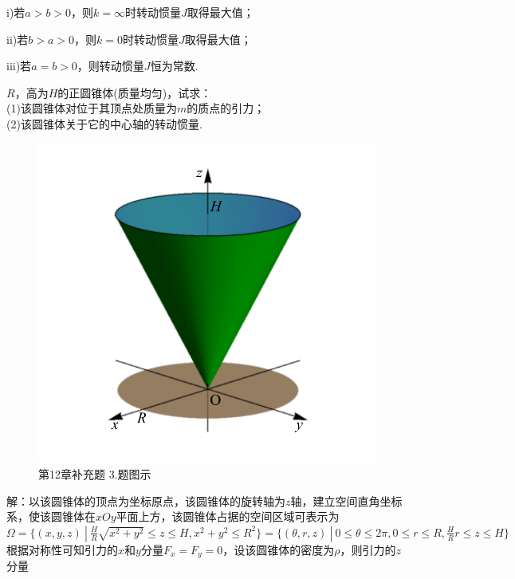 \documentclass[12pt,UTF8]{ctexart}
\newcommand\Set[2]{\{#1\ |\ #2 \}}
\begin{document}
\begin{enumerate}
i)若$a>b>0$，则$k=\infty$时转动惯量$J$取得最大值；

ii)若$b>a>0$，则$k=0$时转动惯量$J$取得最大值；

iii)若$a=b>0$，则转动惯量$J$恒为常数.

$R$，高为$H$的正圆锥体(质量均匀)，试求：\\
(1)该圆锥体对位于其顶点处质量为$m$的质点的引力；\\
(2)该圆锥体关于它的中心轴的转动惯量.

\begin{figure}[H]
\begin{center}
\includegraphics[height=0.7\textheight]{Figures21/Fig12-C-3.pdf}
\end{center}
\caption{第12章补充题 3.题图示}
\label{12-C-3}
\end{figure}

解：以该圆锥体的顶点为坐标原点，该圆锥体的旋转轴为$z$轴，建立空间直角坐标系，使该圆锥体在$xOy$平面上方，该圆锥体占据的空间区域可表示为$\Omega=\Set{(x,y,z)}{\frac HR\sqrt{x^2+y^2}\leqslant z\leqslant H,x^2+y^2\leqslant R^2}=\Set{(\theta,r,z)}{0\leqslant\theta\leqslant2\pi,0\leqslant r\leqslant R,\frac HRr\leqslant z\leqslant H}$根据对称性可知引力的$x$和$y$分量$F_x=F_y=0$，设该圆锥体的密度为$\rho$，则引力的$z$分量


\end{enumerate}
\end{document}
